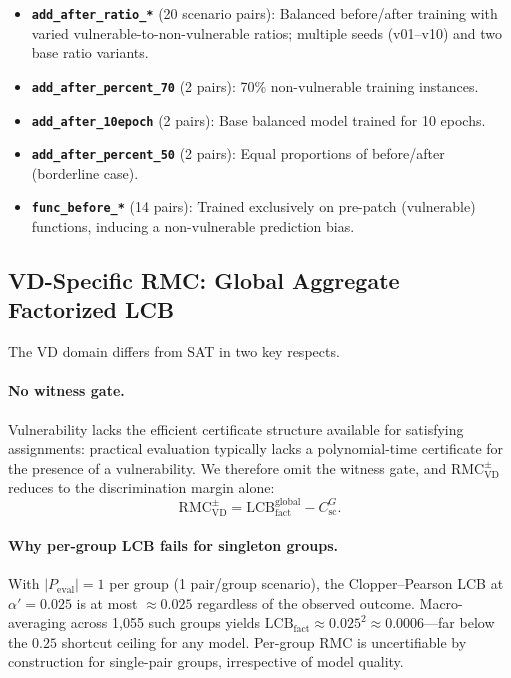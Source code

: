 \documentclass[conference]{IEEEtran}
\theoremstyle{remark}
\newcommand{\LCB}{\mathrm{LCB}}
\newcommand{\RMCVD}{\mathrm{RMC}_{\mathrm{VD}}}
\newcommand{\shortcutCeiling}{C_{\mathrm{sc}}^{G}}
\begin{document}
\begin{itemize}[leftmargin=*, itemsep=2pt]
\item \textbf{\texttt{add\_after\_ratio\_*}} (20 scenario pairs): Balanced before/after training with varied vulnerable-to-non-vulnerable ratios; multiple seeds (v01--v10) and two base ratio variants.
\item \textbf{\texttt{add\_after\_percent\_70}} (2 pairs): 70\% non-vulnerable training instances.
\item \textbf{\texttt{add\_after\_10epoch}} (2 pairs): Base balanced model trained for 10 epochs.
\item \textbf{\texttt{add\_after\_percent\_50}} (2 pairs): Equal proportions of before/after (borderline case).
\item \textbf{\texttt{func\_before\_*}} (14 pairs): Trained exclusively on pre-patch (vulnerable) functions, inducing a non-vulnerable prediction bias.
\end{itemize}

\subsection{VD-Specific RMC: Global Aggregate Factorized LCB}
\label{sec:vd_rmc}

The VD domain differs from SAT in two key respects.

\paragraph{No witness gate.}
Vulnerability lacks the efficient certificate structure available for satisfying assignments: practical evaluation typically lacks a polynomial-time certificate for the presence of a vulnerability.
We therefore omit the witness gate, and $\RMCVD^{\pm}$ reduces to the discrimination margin alone:
\begin{equation}\label{eq:formula-63}
\RMCVD^{\pm} = \LCB_{\mathrm{fact}}^{\mathrm{global}} - \shortcutCeiling.
\end{equation}

\paragraph{Why per-group LCB fails for singleton groups.}
With $|P_{\mathrm{eval}}|=1$ per group (1 pair/group scenario), the Clopper--Pearson LCB at $\alpha'=0.025$ is at most $\approx0.025$ regardless of the observed outcome.
Macro-averaging across 1,055 such groups yields $\LCB_{\mathrm{fact}}\approx 0.025^2\approx 0.0006$---far below the $0.25$ shortcut ceiling for any model.
Per-group RMC is uncertifiable by construction for single-pair groups, irrespective of model quality.
\end{document}

